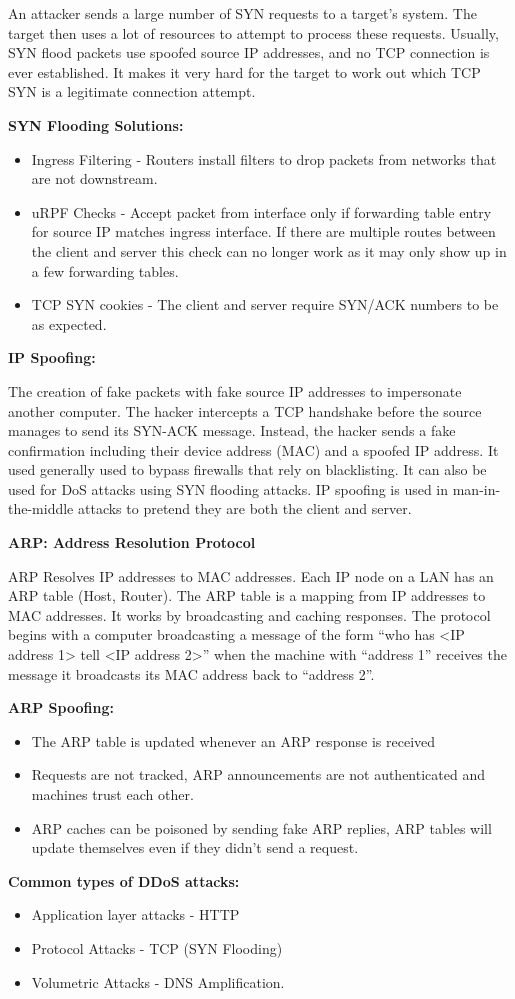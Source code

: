 \documentclass[]{article}
\begin{document}
An attacker sends a large number of SYN requests to a target's system.
The target then uses a lot of resources to attempt to process these
requests. Usually, SYN flood packets use spoofed source IP addresses,
and no TCP connection is ever established. It makes it very hard for the
target to work out which TCP SYN is a legitimate connection attempt.

\textbf{SYN Flooding Solutions:}

\begin{itemize}
\item
  Ingress Filtering - Routers install filters to drop packets from
  networks that are not downstream.
\item
  uRPF Checks - Accept packet from interface only if forwarding table
  entry for source IP matches ingress interface. If there are multiple
  routes between the client and server this check can no longer work as
  it may only show up in a few forwarding tables.
\item
  TCP SYN cookies - The client and server require SYN/ACK numbers to be
  as expected.
\end{itemize}

\textbf{IP Spoofing:}

The creation of fake packets with fake source IP addresses to
impersonate another computer. The hacker intercepts a TCP handshake
before the source manages to send its SYN-ACK message. Instead, the
hacker sends a fake confirmation including their device address (MAC)
and a spoofed IP address. It used generally used to bypass firewalls
that rely on blacklisting. It can also be used for DoS attacks using SYN
flooding attacks. IP spoofing is used in man-in-the-middle attacks to
pretend they are both the client and server.

\textbf{ARP: Address Resolution Protocol}

ARP Resolves IP addresses to MAC addresses. Each IP node on a LAN has an
ARP table (Host, Router). The ARP table is a mapping from IP addresses
to MAC addresses. It works by broadcasting and caching responses. The
protocol begins with a computer broadcasting a message of the form ``who
has \textless{}IP address 1\textgreater{} tell \textless{}IP address
2\textgreater{}'' when the machine with ``address 1'' receives the
message it broadcasts its MAC address back to ``address 2''.

\textbf{ARP Spoofing:}

\begin{itemize}
\item
  The ARP table is updated whenever an ARP response is received
\item
  Requests are not tracked, ARP announcements are not authenticated and
  machines trust each other.
\item
  ARP caches can be poisoned by sending fake ARP replies, ARP tables
  will update themselves even if they didn't send a request.
\end{itemize}

\textbf{Common types of DDoS attacks:}

\begin{itemize}
\item
  Application layer attacks - HTTP
\item
  Protocol Attacks - TCP (SYN Flooding)
\item
  Volumetric Attacks - DNS Amplification.
\end{itemize}
\end{document}
